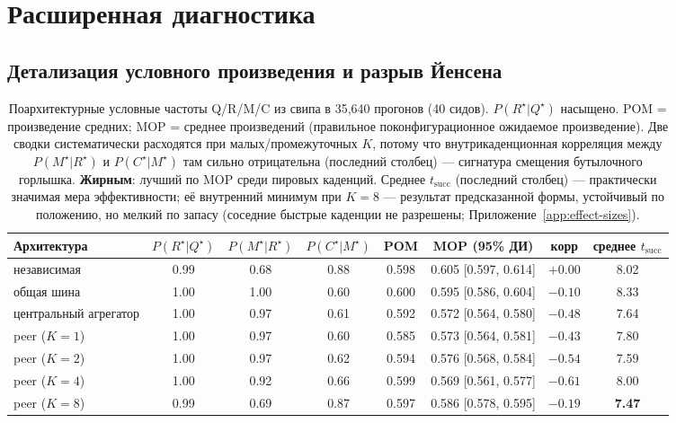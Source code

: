 \documentclass{article}
\begin{document}
\section{Расширенная диагностика}
\label{app:diagnostics}

\subsection{Детализация условного произведения и разрыв Йенсена}
\label{app:phi-detail}

\begin{table}[h]
\caption{Поархитектурные условные частоты Q/R/M/C из свипа в 35{,}640 прогонов (40 сидов). $P(R^\star|Q^\star)$ насыщено. POM = произведение средних; MOP = среднее произведений (правильное поконфигурационное ожидаемое произведение). Две сводки систематически расходятся при малых/промежуточных $K$, потому что внутрикаденционная корреляция между $P(M^\star|R^\star)$ и $P(C^\star|M^\star)$ там сильно отрицательна (последний столбец) --- сигнатура смещения бутылочного горлышка. \textbf{Жирным}: лучший по MOP среди пировых каденций. Среднее $t_{\mathrm{succ}}$ (последний столбец) --- практически значимая мера эффективности; её внутренний минимум при $K=8$ --- результат предсказанной формы, устойчивый по положению, но мелкий по запасу (соседние быстрые каденции не разрешены; Приложение~\ref{app:effect-sizes}).}
\label{tab:multi-agent-cond}
\centering
\scriptsize
\setlength{\tabcolsep}{3.5pt}
\begin{tabular}{l c c c c c c c}
\toprule
Архитектура & $P(R^\star|Q^\star)$ & $P(M^\star|R^\star)$ & $P(C^\star|M^\star)$ & POM & MOP (95\% ДИ) & корр & среднее $t_{\mathrm{succ}}$ \\
\midrule
независимая          & 0.99 & 0.68 & 0.88 & 0.598 & 0.605 [0.597, 0.614] & $+0.00$ & 8.02 \\
общая шина           & 1.00 & 1.00 & 0.60 & 0.600 & 0.595 [0.586, 0.604] & $-0.10$ & 8.33 \\
центральный агрегатор   & 1.00 & 0.97 & 0.61 & 0.592 & 0.572 [0.564, 0.580] & $-0.48$ & 7.64 \\
peer ($K=1$)         & 1.00 & 0.97 & 0.60 & 0.585 & 0.573 [0.564, 0.581] & $-0.43$ & 7.80 \\
peer ($K=2$)         & 1.00 & 0.97 & 0.62 & 0.594 & 0.576 [0.568, 0.584] & $-0.54$ & 7.59 \\
peer ($K=4$)         & 1.00 & 0.92 & 0.66 & 0.599 & 0.569 [0.561, 0.577] & $-0.61$ & 8.00 \\
peer ($K=8$)         & 0.99 & 0.69 & 0.87 & 0.597 & 0.586 [0.578, 0.595] & $-0.19$ & \textbf{7.47} \\

\end{tabular}
\end{table}
\end{document}
